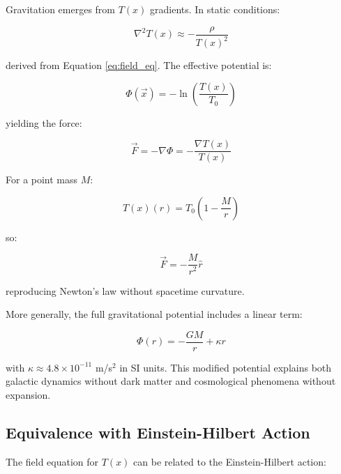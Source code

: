\documentclass[aps,prl,twocolumn,superscriptaddress,nofootinbib]{revtex4-2}
\newcommand{\Tfield}{T(x)}
\newcommand{\Tzero}{T_0}
\newcommand{\vecx}{\vec{x}}
\begin{document}
	Gravitation emerges from $\Tfield$ gradients. In static conditions:
	
	\begin{equation}
		\nabla^2\Tfield \approx -\frac{\rho}{\Tfield^2}
		\label{eq:static_field}
	\end{equation}
	
	derived from Equation \ref{eq:field_eq}. The effective potential is:
	
	\begin{equation}
		\Phi(\vecx) = -\ln\left(\frac{\Tfield}{\Tzero}\right)
		\label{eq:grav_potential_def}
	\end{equation}
	
	yielding the force:
	
	\begin{equation}
		\vec{F} = -\nabla\Phi = -\frac{\nabla\Tfield}{\Tfield}
		\label{eq:force_from_potential}
	\end{equation}
	
	For a point mass $M$:
	
	\begin{equation}
		\Tfield(r) = \Tzero\left(1 - \frac{M}{r}\right)
		\label{eq:time_field_point_mass}
	\end{equation}
	
	so:
	
	\begin{equation}
		\vec{F} = -\frac{M}{r^2} \hat{r}
		\label{eq:newton_law}
	\end{equation}
	
	reproducing Newton's law without spacetime curvature.
	
	More generally, the full gravitational potential includes a linear term:
	
	\begin{equation}
		\Phi(r) = -\frac{GM}{r} + \kappa r
		\label{eq:modified_potential}
	\end{equation}
	
	with $\kappa \approx 4.8 \times 10^{-11}$ m/s$^2$ in SI units. This modified potential explains both galactic dynamics without dark matter and cosmological phenomena without expansion.
	
	\subsection{Equivalence with Einstein-Hilbert Action}
	\label{subsec:einstein_hilbert}
	
	The field equation for $\Tfield$ can be related to the Einstein-Hilbert action:
	
\end{document}
